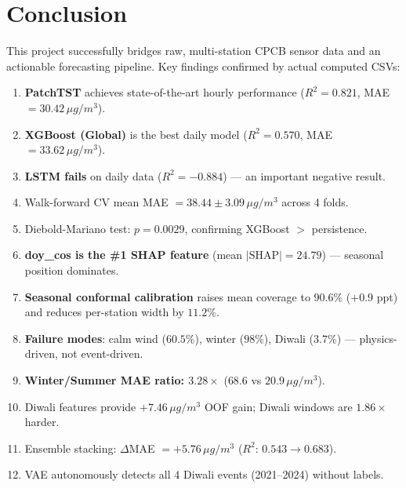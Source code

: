 \documentclass[11pt,a4paper]{article}
\begin{document}
\section{Conclusion}
This project successfully bridges raw, multi-station CPCB sensor data and an actionable forecasting pipeline. Key findings confirmed by actual computed CSVs:
\begin{enumerate}
    \item \textbf{PatchTST} achieves state-of-the-art hourly performance ($R^2=0.821$, MAE $= 30.42\,\mu g/m^3$).
    \item \textbf{XGBoost (Global)} is the best daily model ($R^2=0.570$, MAE $= 33.62\,\mu g/m^3$).
    \item \textbf{LSTM fails} on daily data ($R^2=-0.884$) --- an important negative result.
    \item Walk-forward CV mean MAE $= 38.44 \pm 3.09\,\mu g/m^3$ across 4 folds.
    \item Diebold-Mariano test: $p=0.0029$, confirming XGBoost $>$ persistence.
    \item \textbf{doy\_cos is the \#1 SHAP feature} (mean $|\text{SHAP}|=24.79$) --- seasonal position dominates.
    \item \textbf{Seasonal conformal calibration} raises mean coverage to $90.6\%$ ($+0.9$ ppt) and reduces per-station width by $11.2\%$.
    \item \textbf{Failure modes}: calm wind ($60.5\%$), winter ($98\%$), Diwali ($3.7\%$) --- physics-driven, not event-driven.
    \item \textbf{Winter/Summer MAE ratio: $3.28\times$} ($68.6$ vs $20.9\,\mu g/m^3$).
    \item Diwali features provide $+7.46\,\mu g/m^3$ OOF gain; Diwali windows are $1.86\times$ harder.
    \item Ensemble stacking: $\Delta$MAE $=+5.76\,\mu g/m^3$ ($R^2$: $0.543 \to 0.683$).
    \item VAE autonomously detects all 4 Diwali events (2021--2024) without labels.
\end{enumerate}
\end{document}
